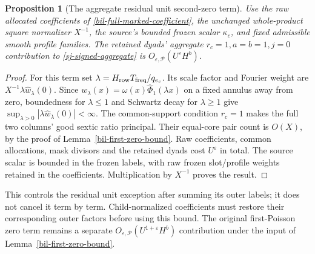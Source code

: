 \documentclass[11pt]{article}
\newtheorem{proposition}[theorem]{Proposition}
\theoremstyle{definition}
\newcommand{\eps}{\varepsilon}
\begin{document}
\begin{proposition}[The aggregate residual unit second-zero term]
\label{sj-unit-zero-bound}
Use the raw allocated coefficients of
\eqref{bil-full-marked-coefficient}, the unchanged whole-product square
normalizer $X^{-1}$, the source's bounded frozen scalar $\kappa_c$,
and fixed admissible smooth profile families. The retained dyads'
aggregate $r_c=1,a=b=1,j=0$ contribution to
\eqref{sj-signed-aggregate} is $O_{\eps,\mathcal P}(U^\eps H^b)$.
\end{proposition}
\begin{proof}
For this term set $\lambda=H_{\rm row}T_{\rm freq}/q_{e_c}$.
Its scale factor and Fourier weight are $X^{-1}\lambda\widehat
w_\lambda(0)$. Since $w_\lambda(x)=\omega(x)\widehat\Phi_1(\lambda x)$
on a fixed annulus away from zero, boundedness for $\lambda\le1$ and
Schwartz decay for $\lambda\ge1$ give
$\sup_{\lambda>0}|\lambda\widehat w_\lambda(0)|<\infty$.
The common-support condition $r_c=1$ makes the full two columns'
good sextic ratio principal. Their equal-core pair count is $O(X)$,
by the proof of Lemma~\ref{bil-first-zero-bound}.
Raw coefficients, common allocations, mask divisors and the retained
dyads cost $U^\eps$ in total. The source scalar is bounded in the
frozen labels, with raw frozen slot/profile weights retained in the
coefficients. Multiplication by $X^{-1}$ proves the result.
\end{proof}
This controls the residual unit exception after summing its outer labels;
it does not cancel it term by term. Child-normalized coefficients must
restore their corresponding outer factors before using this bound.
The original first-Poisson zero term remains a separate
$O_{\eps,\mathcal P}(U^{1+\eps}H^b)$ contribution under the input of
Lemma~\ref{bil-first-zero-bound}.
\end{document}
